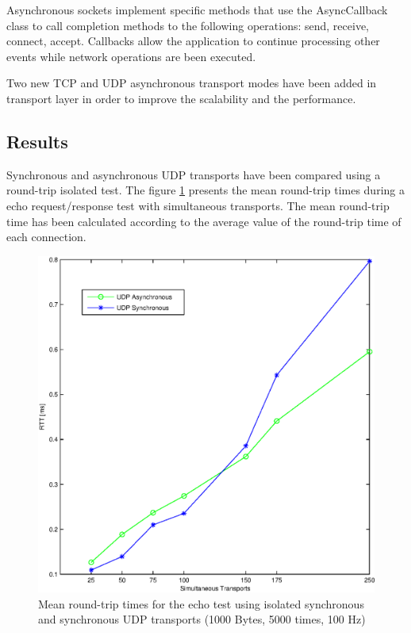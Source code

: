 Asynchronous sockets implement specific methods that use  the AsyncCallback class to call completion methods to the following operations: send, receive, connect, accept. Callbacks allow the application to continue processing other events while network operations are been executed.

Two new TCP and UDP asynchronous transport modes have been added in transport layer in order to improve the scalability and the performance.

\subsection{Results}\label{SS:Transports-Results}

Synchronous and asynchronous UDP transports have been compared using a round-trip isolated test. The figure \ref{fig:coder-udp-transports} presents the mean round-trip times during a echo request/response test with simultaneous transports. The mean round-trip time has been calculated according to the average value of the round-trip time of each connection.
 
\begin{figure}[H]\begin{center}
 \centering
  \captionsetup{justification=centering}
  \includegraphics[scale=0.5]{pictures/network/UDPTransports}
  \caption{Mean round-trip times for the echo test using isolated synchronous and synchronous UDP transports (1000 Bytes, 5000 times, 100 Hz) \label{fig:coder-udp-transports}}
\end{center}\end{figure}

